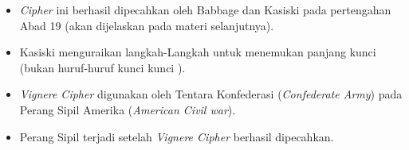 \documentclass{article}
\begin{document}

\begin{itemize}
  \item \textit{Cipher} ini berhasil dipecahkan oleh Babbage dan Kasiski pada pertengahan Abad 19 (akan dijelaskan pada materi selanjutnya).
  \item Kasiski menguraikan langkah-Langkah untuk menemukan panjang kunci (bukan huruf-huruf kunci kunci ).
  \item \textit{Vignere Cipher} digunakan oleh Tentara Konfederasi (\textit{Confederate Army}) pada Perang Sipil Amerika (\textit{American Civil war}).
  \item Perang Sipil terjadi setelah \textit{Vignere Cipher} berhasil dipecahkan.
\end{itemize}
\end{document}
